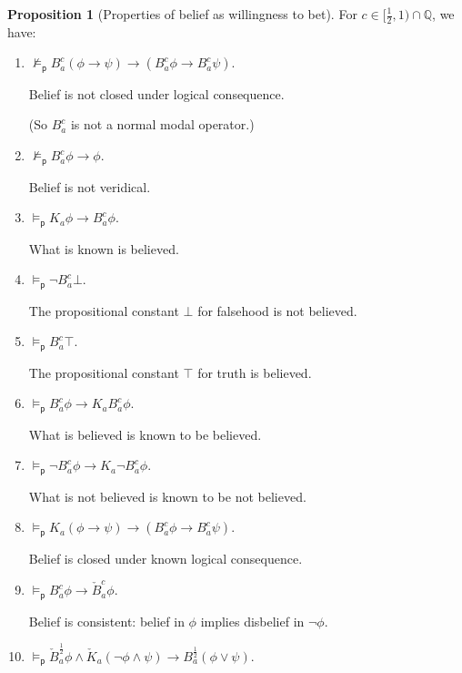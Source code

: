\documentclass[12pt]{article}
\theoremstyle{definition}
\newtheorem{proposition}[theorem]{Proposition}
\newcommand{\Rat}{\mathbb{Q}}  %
\newcommand{\modelsp}{\models_{\mathsf{p}}}                  %
\begin{document}
\begin{proposition}[Properties of belief as willingness to bet]
  \label{prop:belief}
  For $c\in[\frac 12,1)\cap\Rat$, we have:
  \begin{enumerate}
  \item \label{item:B-not-normal} $\not\modelsp
    B_a^c(\phi\to\psi)\to(B_a^c\phi\to B_a^c\psi)$.

    Belief is not closed under logical consequence.

    (So $B_a^c$ is not a normal modal operator.)

  \item \label{item:B-not-T} $\not\modelsp B_a^c\phi\to\phi$.

    Belief is not veridical.

  \item \label{item:B-C} $\modelsp K_a\phi\to B_a^c\phi$.

    What is known is believed.

  \item \label{item:B-B} $\modelsp\lnot B^c_a\bot$.

    The propositional constant $\bot$ for falsehood is not believed.

  \item \label{item:B-N} $\modelsp B_a^c\top$.

    The propositional constant $\top$ for truth is believed.

  \item \label{item:B-Ap} $\modelsp B_a^c\phi\to K_aB_a^c\phi$.

    What is believed is known to be believed.

  \item \label{item:B-An} $\modelsp \lnot B_a^c\phi\to K_a\lnot
    B_a^c\phi$.

    What is not believed is known to be not believed.

  \item \label{item:B-M} $\modelsp K_a(\phi\to\psi)\to(B_a^c\phi\to B_a^c\psi)$.

    Belief is closed under known logical consequence.

  \item \label{item:B-D} $\modelsp B_a^c\phi\to \check B_a^c\phi$.

    Belief is consistent: belief in $\phi$ implies
    disbelief in $\lnot\phi$.

  \item \label{item:B-SC} $\modelsp
    \check{B}_a^{\frac 12} \phi \land \check{K}_a(\neg \phi \land \psi)
    \rightarrow B_a^{\frac 12} (\phi \lor \psi)$.
    

\end{enumerate}
\end{proposition}
\end{document}
